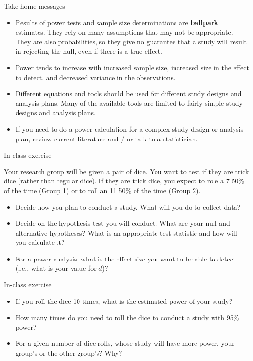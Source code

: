\documentclass[ignorenonframetext,]{beamer}
\providecommand{\tightlist}{%
  \setlength{\itemsep}{0pt}\setlength{\parskip}{0pt}}
\begin{document}
\begin{frame}{Take-home messages}

\begin{itemize}
\tightlist
\item
  Results of power tests and sample size determinations are
  \textbf{ballpark} estimates. They rely on many assumptions that may
  not be appropriate. They are also probabilities, so they give no
  guarantee that a study will result in rejecting the null, even if
  there is a true effect.
\item
  Power tends to increase with increased sample size, increased size in
  the effect to detect, and decreased variance in the observations.
\item
  Different equations and tools should be used for different study
  designs and analysis plans. Many of the available tools are limited to
  fairly simple study designs and analysis plans.
\item
  If you need to do a power calculation for a complex study design or
  analysis plan, review current literature and / or talk to a
  statistician.
\end{itemize}

\end{frame}

\begin{frame}{In-class exercise}

Your research group will be given a pair of dice. You want to test if
they are trick dice (rather than regular dice). If they are trick dice,
you expect to role a 7 50\% of the time (Group 1) or to roll an 11 50\%
of the time (Group 2).

\begin{itemize}
\tightlist
\item
  Decide how you plan to conduct a study. What will you do to collect
  data?
\item
  Decide on the hypothesis test you will conduct. What are your null and
  alternative hypotheses? What is an appropriate test statistic and how
  will you calculate it?
\item
  For a power analysis, what is the effect size you want to be able to
  detect (i.e., what is your value for \(d\))?
\end{itemize}

\end{frame}

\begin{frame}{In-class exercise}

\begin{itemize}
\tightlist
\item
  If you roll the dice 10 times, what is the estimated power of your
  study?
\item
  How many times do you need to roll the dice to conduct a study with
  95\% power?
\item
  For a given number of dice rolls, whose study will have more power,
  your group's or the other group's? Why?
\end{itemize}

\end{frame}
\end{document}
